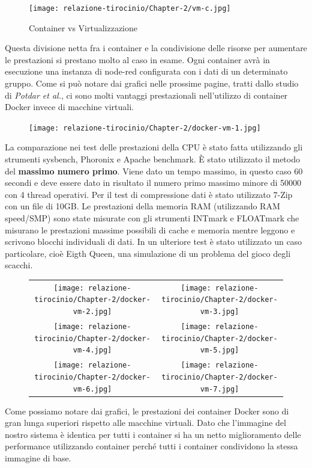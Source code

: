 \documentclass[a4paper,10pt]{memoir}
\begin{document}
\begin{figure}[ht]
\caption{Container vs Virtualizzazione}
\texttt{[image: relazione-tirocinio/Chapter-2/vm-c.jpg]}
\end{figure}
Questa divisione netta fra i container e la condivisione delle risorse per aumentare le prestazioni si prestano molto al caso in esame. Ogni container avrà in esecuzione una instanza di node-red configurata con i dati di un determinato gruppo.
Come si può notare dai grafici nelle prossime pagine, tratti dallo studio di \textit{Potdar et al.}\cite{dockervsvm}, ci sono molti vantaggi prestazionali nell'utilizzo di container Docker invece di macchine virtuali.

\begin{figure}
    \texttt{[image: relazione-tirocinio/Chapter-2/docker-vm-1.jpg]}
    \label{fig:docker-vm-1}
\end{figure}
La comparazione nei test delle prestazioni della CPU è stato fatta utilizzando gli strumenti sysbench, Phoronix e Apache benchmark. È stato utilizzato il metodo del \textbf{massimo numero primo}.
Viene dato un tempo massimo, in questo caso 60 secondi e deve essere dato in risultato il numero primo massimo minore di 50000 con 4 thread operativi.
Per il test di compressione dati è stato utilizzato 7-Zip con un file di 10GB.
Le prestazioni della memoria RAM (utilizzando RAM speed/SMP) sono state misurate con gli strumenti INTmark e FLOATmark che misurano le prestazioni massime possibili di cache e memoria mentre leggono e scrivono blocchi individuali di dati.
In un ulteriore test è stato utilizzato un caso particolare, cioè Eigth Queen, una simulazione di un problema del gioco degli scacchi.
\begin{figure}
\begin{tabular}{cc}
  \texttt{[image: relazione-tirocinio/Chapter-2/docker-vm-2.jpg]} &   \texttt{[image: relazione-tirocinio/Chapter-2/docker-vm-3.jpg]} \\
 \texttt{[image: relazione-tirocinio/Chapter-2/docker-vm-4.jpg]} &   \texttt{[image: relazione-tirocinio/Chapter-2/docker-vm-5.jpg]} \\
 \texttt{[image: relazione-tirocinio/Chapter-2/docker-vm-6.jpg]} &   \texttt{[image: relazione-tirocinio/Chapter-2/docker-vm-7.jpg]} \\
\end{tabular}
\end{figure}
Come possiamo notare dai grafici, le prestazioni dei container Docker sono di gran lunga superiori rispetto alle macchine virtuali. Dato che l'immagine del nostro sistema è identica per tutti i container si ha un netto miglioramento delle performance utilizzando container perché tutti i container condividono la stessa immagine di base.
\end{document}
